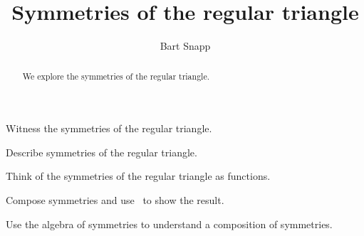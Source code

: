 \documentclass[noauthor,nooutcomes,hints,handout]{ximera}
\title{Symmetries of the regular triangle}
\author{Bart Snapp}
\begin{document}
\begin{abstract}
  We explore the symmetries of the regular triangle.
\end{abstract}
\maketitle

\begin{listOutcomes}
\item Witness the symmetries of the regular triangle.
\item Describe symmetries of the regular triangle.
\item Think of the symmetries of the regular triangle as functions.
\item Compose symmetries and use \snap\ to show the result.
\item Use the algebra of symmetries to understand a composition of
  symmetries.
\end{listOutcomes}
\mynewpage
\end{document}

